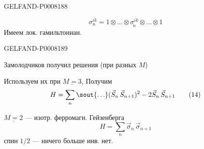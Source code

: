 \begin{GelfandAdjacentEvidence}{GELFAND-P000818}{8}

\[
\sigma_n^{ik}=1\otimes\ldots\otimes\underset{n}{\sigma^{ik}}\otimes\ldots\otimes1
\]
Имеем лок. гамильтониан.

\end{GelfandAdjacentEvidence}
\begin{GelfandAdjacentEvidence}{GELFAND-P000818}{9}


Замолодчиков получил  решения (при разных \(M\))

Используем их при \(\underline{M=3}\), Получим
\begin{equation*}
H=\sum_n\text{\sout{\(\ldots\)}}(\vec{S}_n\,\vec{S}_{n+1})^2-2\vec{S}_n\,\vec{S}_{n+1}\tag{14}
\end{equation*}
\end{GelfandAdjacentEvidence}


\(\underline{M=2}\) — изотр. ферромагн. Гейзенберга
\begin{equation*}
H=\sum_n\vec{\sigma}_n\,\vec{\sigma}_{n+1}\tag{15}
\end{equation*}
спин \(1/2\) — ничего больше инв. нет.


